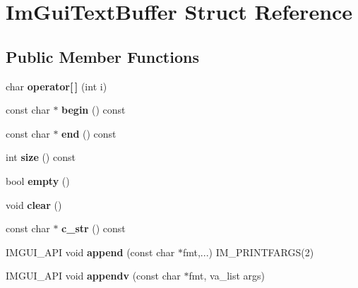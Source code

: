 \hypertarget{struct_im_gui_text_buffer}{}\section{Im\+Gui\+Text\+Buffer Struct Reference}
\label{struct_im_gui_text_buffer}
\subsection*{Public Member Functions}
\begin{DoxyCompactItemize}
\item 
\mbox{\label{struct_im_gui_text_buffer_a8550f53463fd12711e3d08b740227bd4}} 
char {\bfseries operator\mbox{[}$\,$\mbox{]}} (int i)
\item 
\mbox{\label{struct_im_gui_text_buffer_aab6d83c6b9a8061287a4cb6135c1cab4}} 
const char $\ast$ {\bfseries begin} () const
\item 
\mbox{\label{struct_im_gui_text_buffer_a2fc30ad0d384f98dfcea722f798d91f2}} 
const char $\ast$ {\bfseries end} () const
\item 
\mbox{\label{struct_im_gui_text_buffer_a2811fcd43e0224eb3bd0f3464b634289}} 
int {\bfseries size} () const
\item 
\mbox{\label{struct_im_gui_text_buffer_afdef38ae725bb5495f0143170fa902c8}} 
bool {\bfseries empty} ()
\item 
\mbox{\label{struct_im_gui_text_buffer_a9e4edc9f950bc9e35d5c3b3071dbc0df}} 
void {\bfseries clear} ()
\item 
\mbox{\label{struct_im_gui_text_buffer_afb03439bc91723e274bfb9d247a691b9}} 
const char $\ast$ {\bfseries c\+\_\+str} () const
\item 
\mbox{\label{struct_im_gui_text_buffer_ad46e8b562f859ca163b19b5bf35f4c6f}} 
I\+M\+G\+U\+I\+\_\+\+A\+PI void {\bfseries append} (const char $\ast$fmt,...) I\+M\+\_\+\+P\+R\+I\+N\+T\+F\+A\+R\+GS(2)
\item 
\mbox{\label{struct_im_gui_text_buffer_a99af27120fb6b8f72c34e53b3228563b}} 
I\+M\+G\+U\+I\+\_\+\+A\+PI void {\bfseries appendv} (const char $\ast$fmt, va\+\_\+list args)
\end{DoxyCompactItemize}
